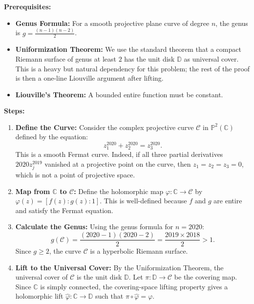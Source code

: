 \begin{solution}
\textbf{Prerequisites:} 
\begin{itemize}
    \item \textbf{Genus Formula:} For a smooth projective plane curve of degree $n$, the genus is $g = \frac{(n-1)(n-2)}{2}$.
    \item \textbf{Uniformization Theorem:} We use the standard theorem that a compact Riemann surface of genus at least $2$ has the unit disk $\mathbb{D}$ as universal cover. This is a heavy but natural dependency for this problem; the rest of the proof is then a one-line Liouville argument after lifting.
    \item \textbf{Liouville's Theorem:} A bounded entire function must be constant.
\end{itemize}

\bigskip

\textbf{Steps:}
\begin{enumerate}
    \item \textbf{Define the Curve:} Consider the complex projective curve $\mathcal{C}$ in $\mathbb{P}^2(\mathbb{C})$ defined by the equation:
    \[ z_1^{2020} + z_2^{2020} = z_3^{2020}. \]
    This is a smooth Fermat curve. Indeed, if all three partial derivatives $2020z_j^{2019}$ vanished at a projective point on the curve, then $z_1=z_2=z_3=0$, which is not a point of projective space. \\[2ex]

    \item \textbf{Map from $\mathbb{C}$ to $\mathcal{C}$:} Define the holomorphic map $\varphi: \mathbb{C} \to \mathcal{C}$ by $\varphi(z) = [f(z) : g(z) : 1]$. This is well-defined because $f$ and $g$ are entire and satisfy the Fermat equation. \\[2ex]

    \item \textbf{Calculate the Genus:} Using the genus formula for $n=2020$:
    \[ g(\mathcal{C}) = \frac{(2020-1)(2020-2)}{2} = \frac{2019 \times 2018}{2} > 1. \]
    Since $g \geq 2$, the curve $\mathcal{C}$ is a hyperbolic Riemann surface. \\[2ex]

    \item \textbf{Lift to the Universal Cover:} By the Uniformization Theorem, the universal cover of $\mathcal{C}$ is the unit disk $\mathbb{D}$. Let $\pi:\mathbb{D}\to\mathcal{C}$ be the covering map. Since $\mathbb{C}$ is simply connected, the covering-space lifting property gives a holomorphic lift $\widehat{\varphi}: \mathbb{C} \to \mathbb{D}$ such that $\pi \circ \widehat{\varphi} = \varphi$. \\[2ex]


\end{enumerate}
\end{solution}
